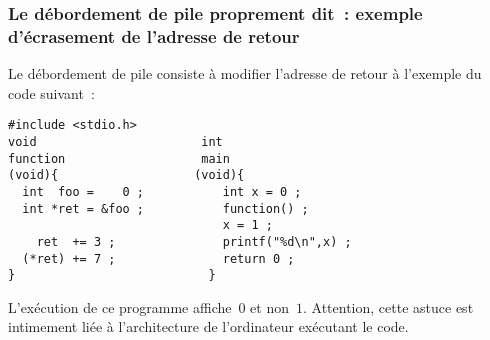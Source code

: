 \begin{frame}[fragile]
  \frametitle{Le d\'ebordement de pile proprement dit~: exemple
    d'\'ecrasement de l'adresse de retour}%
  Le d\'ebordement de pile consiste \`a modifier l'adresse de retour
  \`a l'exemple du code suivant~:
\begin{verbatim}
#include <stdio.h>                               
void                       int 
function                   main 
(void){                   (void){
  int  foo =    0 ;           int x = 0 ;        
  int *ret = &foo ;           function() ;      
                              x = 1 ;            
    ret  += 3 ;               printf("%d\n",x) ; 
  (*ret) += 7 ;               return 0 ;                 
}                           }                    
\end{verbatim}
  L'ex\'ecution de ce programme affiche~$0$ et non~$1$. Attention,
  cette astuce est intimement li\'ee \`a l'architecture de
  l'ordinateur ex\'ecutant le code.
\end{frame}

